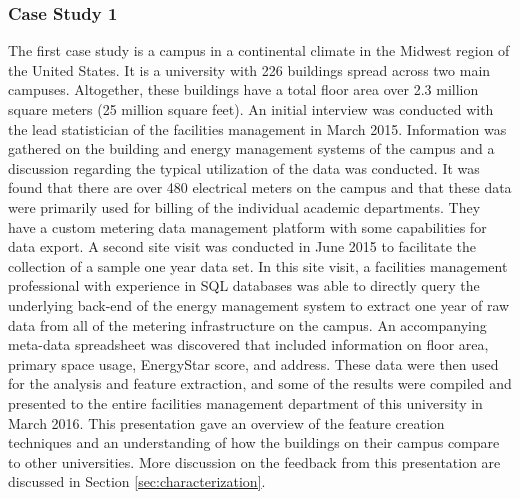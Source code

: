 \subsubsection{Case Study 1} 
\label{sec:casestudy1}
The first case study is a campus in a continental climate in the Midwest region of the United States. It is a university with 226 buildings spread across two main campuses. Altogether, these buildings have a total floor area over 2.3 million square meters (25 million square feet). An initial interview was conducted with the lead statistician of the facilities management in March 2015. Information was gathered on the building and energy management systems of the campus and a discussion regarding the typical utilization of the data was conducted. It was found that there are over 480 electrical meters on the campus and that these data were primarily used for billing of the individual academic departments. They have a custom metering data management platform with some capabilities for data export. A second site visit was conducted in June 2015 to facilitate the collection of a sample one year data set. In this site visit, a facilities management professional with experience in SQL databases was able to directly query the underlying back-end of the energy management system to extract one year of raw data from all of the metering infrastructure on the campus. An accompanying meta-data spreadsheet was discovered that included information on floor area, primary space usage, EnergyStar score, and address. These data were then used for the analysis and feature extraction, and some of the results were compiled and presented to the entire facilities management department of this university in March 2016. This presentation gave an overview of the feature creation techniques and an understanding of how the buildings on their campus compare to other universities. More discussion on the feedback from this presentation are discussed in Section \ref{sec:characterization}.

